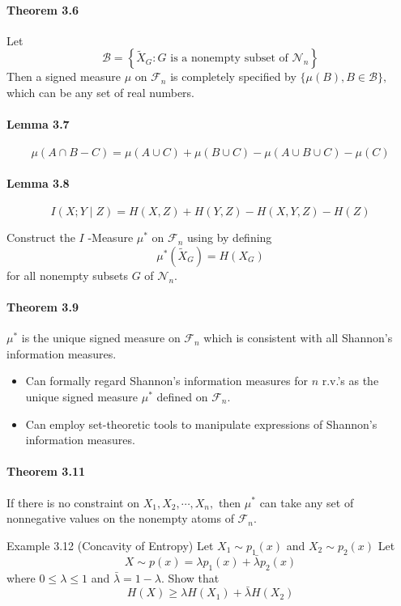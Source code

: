 \documentclass[8pt]{article}
\begin{document}
\paragraph{Theorem 3.6} Let
$$
\mathcal{B}=\left\{\tilde{X}_{G}: G \text { is a nonempty subset of } \mathcal{N}_{n}\right\}
$$
Then a signed measure $\mu$ on $\mathcal{F}_{n}$ is completely specified by $\{\mu(B), B \in \mathcal{B}\},$ which can be any set of real numbers.

\paragraph{Lemma 3.7}
$$
\mu(A \cap B-C)=\mu(A \cup C)+\mu(B \cup C)-\mu(A \cup B \cup C)-\mu(C)
$$
\paragraph{Lemma 3.8}
$$
I(X ; Y \mid Z)=H(X, Z)+H(Y, Z)-H(X, Y, Z)-H(Z)
$$

\noindent Construct the $I$ -Measure $\mu^{*}$ on $\mathcal{F}_{n}$ using by defining
$$
\mu^{*}\left(\tilde{X}_{G}\right)=H\left(X_{G}\right)
$$
for all nonempty subsets $G$ of $\mathcal{N}_{n}$.

\paragraph{Theorem 3.9} $\mu^{*}$ is the unique signed measure on $\mathcal{F}_{n}$ which is consistent with all Shannon's information measures.
\begin{itemize}
	\item Can formally regard Shannon's information measures for $n$ r.v.'s as the unique signed measure $\mu^{*}$ defined on $\mathcal{F}_{n}$.
	\item Can employ set-theoretic tools to manipulate expressions of Shannon's information measures.
\end{itemize}

\paragraph{Theorem 3.11} If there is no constraint on $X_{1}, X_{2}, \cdots, X_{n},$ then $\mu^{*}$ can take any set of nonnegative values on the nonempty atoms of $\mathcal{F}_{n}$.

Example 3.12 (Concavity of Entropy) Let $X_{1} \sim p_{1}(x)$ and $X_{2} \sim p_{2}(x)$ Let
$$
X \sim p(x)=\lambda p_{1}(x)+\bar{\lambda} p_{2}(x)
$$
where $0 \leq \lambda \leq 1$ and $\bar{\lambda}=1-\lambda .$ Show that
$$
H(X) \geq \lambda H\left(X_{1}\right)+\bar{\lambda} H\left(X_{2}\right)
$$
\end{document}
